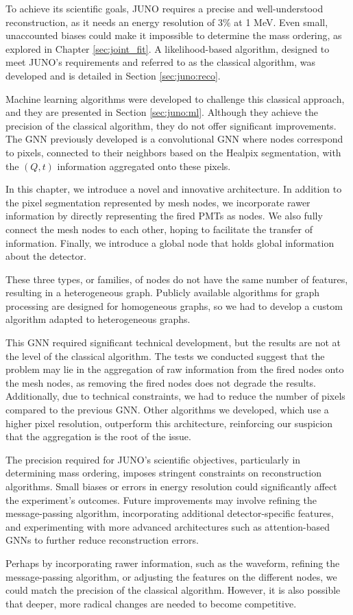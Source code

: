 \documentclass[../main.tex]{subfiles}
\begin{document}
To achieve its scientific goals, JUNO requires a precise and well-understood reconstruction, as it needs an energy resolution of $3\%$ at 1 MeV. Even small, unaccounted biases could make it impossible to determine the mass ordering, as explored in Chapter \ref{sec:joint_fit}. A likelihood-based algorithm, designed to meet JUNO's requirements and referred to as the classical algorithm, was developed and is detailed in Section \ref{sec:juno:reco}.

Machine learning algorithms were developed to challenge this classical approach, and they are presented in Section \ref{sec:juno:ml}. Although they achieve the precision of the classical algorithm, they do not offer significant improvements. The GNN previously developed is a convolutional GNN where nodes correspond to pixels, connected to their neighbors based on the Healpix \cite{gorski_healpix_2005} segmentation, with the $(Q, t)$ information aggregated onto these pixels.

In this chapter, we introduce a novel and innovative architecture. In addition to the pixel segmentation represented by mesh nodes, we incorporate rawer information by directly representing the fired PMTs as nodes. We also fully connect the mesh nodes to each other, hoping to facilitate the transfer of information. Finally, we introduce a global node that holds global information about the detector.

These three types, or families, of nodes do not have the same number of features, resulting in a heterogeneous graph. Publicly available algorithms for graph processing are designed for homogeneous graphs, so we had to develop a custom algorithm adapted to heterogeneous graphs.

This GNN required significant technical development, but the results are not at the level of the classical algorithm. The tests we conducted suggest that the problem may lie in the aggregation of raw information from the fired nodes onto the mesh nodes, as removing the fired nodes does not degrade the results. Additionally, due to technical constraints, we had to reduce the number of pixels compared to the previous GNN. Other algorithms we developed, which use a higher pixel resolution, outperform this architecture, reinforcing our suspicion that the aggregation is the root of the issue.

The precision required for JUNO's scientific objectives, particularly in determining mass ordering, imposes stringent constraints on reconstruction algorithms. Small biases or errors in energy resolution could significantly affect the experiment's outcomes. Future improvements may involve refining the message-passing algorithm, incorporating additional detector-specific features, and experimenting with more advanced architectures such as attention-based GNNs to further reduce reconstruction errors.

Perhaps by incorporating rawer information, such as the waveform, refining the message-passing algorithm, or adjusting the features on the different nodes, we could match the precision of the classical algorithm. However, it is also possible that deeper, more radical changes are needed to become competitive.
\end{document}
